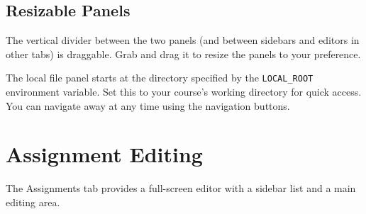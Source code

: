 \documentclass[12pt,letterpaper]{article}
\begin{document}
\subsection{Resizable Panels}

The vertical divider between the two panels (and between sidebars and editors in other tabs) is draggable. Grab and drag it to resize the panels to your preference.

\begin{tipbox}
The local file panel starts at the directory specified by the \texttt{LOCAL\_ROOT} environment variable. Set this to your course's working directory for quick access. You can navigate away at any time using the navigation buttons.
\end{tipbox}


\section{Assignment Editing}

The Assignments tab provides a full-screen editor with a sidebar list and a main editing area.
\end{document}
